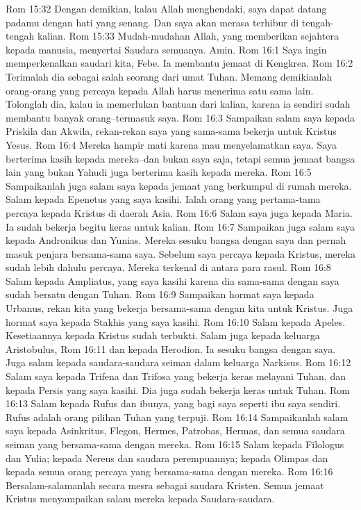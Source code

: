 Rom 15:32  Dengan demikian, kalau Allah menghendaki, saya dapat datang padamu dengan hati yang senang. Dan saya akan merasa terhibur di tengah-tengah kalian.
Rom 15:33  Mudah-mudahan Allah, yang memberikan sejahtera kepada manusia, menyertai Saudara semuanya. Amin.
Rom 16:1  Saya ingin memperkenalkan saudari kita, Febe. Ia membantu jemaat di Kengkrea.
Rom 16:2  Terimalah dia sebagai salah seorang dari umat Tuhan. Memang demikianlah orang-orang yang percaya kepada Allah harus menerima satu sama lain. Tolonglah dia, kalau ia memerlukan bantuan dari kalian, karena ia sendiri sudah membantu banyak orang--termasuk saya.
Rom 16:3  Sampaikan salam saya kepada Priskila dan Akwila, rekan-rekan saya yang sama-sama bekerja untuk Kristus Yesus.
Rom 16:4  Mereka hampir mati karena mau menyelamatkan saya. Saya berterima kasih kepada mereka--dan bukan saya saja, tetapi semua jemaat bangsa lain yang bukan Yahudi juga berterima kasih kepada mereka.
Rom 16:5  Sampaikanlah juga salam saya kepada jemaat yang berkumpul di rumah mereka. Salam kepada Epenetus yang saya kasihi. Ialah orang yang pertama-tama percaya kepada Kristus di daerah Asia.
Rom 16:6  Salam saya juga kepada Maria. Ia sudah bekerja begitu keras untuk kalian.
Rom 16:7  Sampaikan juga salam saya kepada Andronikus dan Yunias. Mereka sesuku bangsa dengan saya dan pernah masuk penjara bersama-sama saya. Sebelum saya percaya kepada Kristus, mereka sudah lebih dahulu percaya. Mereka terkenal di antara para rasul.
Rom 16:8  Salam kepada Ampliatus, yang saya kasihi karena dia sama-sama dengan saya sudah bersatu dengan Tuhan.
Rom 16:9  Sampaikan hormat saya kepada Urbanus, rekan kita yang bekerja bersama-sama dengan kita untuk Kristus. Juga hormat saya kepada Stakhis yang saya kasihi.
Rom 16:10  Salam kepada Apeles. Kesetiaannya kepada Kristus sudah terbukti. Salam juga kepada keluarga Aristobulus,
Rom 16:11  dan kepada Herodion. Ia sesuku bangsa dengan saya. Juga salam kepada saudara-saudara seiman dalam keluarga Narkisus.
Rom 16:12  Salam saya kepada Trifena dan Trifosa yang bekerja keras melayani Tuhan, dan kepada Persis yang saya kasihi. Dia juga sudah bekerja keras untuk Tuhan.
Rom 16:13  Salam kepada Rufus dan ibunya, yang bagi saya seperti ibu saya sendiri. Rufus adalah orang pilihan Tuhan yang terpuji.
Rom 16:14  Sampaikanlah salam saya kepada Asinkritus, Flegon, Hermes, Patrobas, Hermas, dan semua saudara seiman yang bersama-sama dengan mereka.
Rom 16:15  Salam kepada Filologus dan Yulia; kepada Nereus dan saudara perempuannya; kepada Olimpas dan kepada semua orang percaya yang bersama-sama dengan mereka.
Rom 16:16  Bersalam-salamanlah secara mesra sebagai saudara Kristen. Semua jemaat Kristus menyampaikan salam mereka kepada Saudara-saudara.
